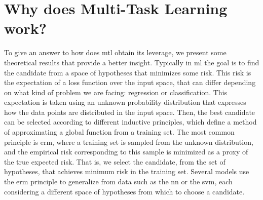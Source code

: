 
\section{Why does Multi-Task Learning work?}\label{sec:ch3_mtl_theory}
To give an answer to how does \acrshort{mtl} obtain its leverage, we present some theoretical results that provide a better insight.
Typically in \acrshort{ml} the goal is to find the candidate from a space of hypotheses that minimizes some risk. 
This risk is the expectation of a loss function over the input space, that can differ depending on what kind of problem we are facing: regression or classification. This expectation is taken using an unknown probability distribution that expresses how the data points are distributed in the input space. 
Then, the best candidate can be selected according to different inductive principles, which define a method of approximating a global function from a training set.
%
%
The most common principle is \acrfull{erm}, where a training set is sampled from the unknown distribution, and the empirical risk corresponding to this sample is minimized as a proxy of the true expected risk. That is, we select the candidate, from the set of hypotheses, that achieves minimum risk in the training set. 
%
Several models use the \acrshort{erm} principle to generalize from data such as the \acrshort{nn} or the \acrshort{svm}, each considering a different space of hypotheses from which to choose a candidate. 
